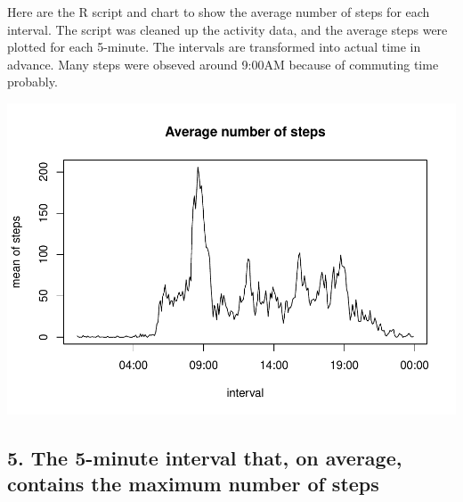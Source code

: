 \documentclass[]{article}
\newenvironment{Shaded}{\begin{snugshade}}{\end{snugshade}}
\newcommand{\KeywordTok}[1]{\textcolor[rgb]{0.13,0.29,0.53}{\textbf{#1}}}
\newcommand{\DataTypeTok}[1]{\textcolor[rgb]{0.13,0.29,0.53}{#1}}
\newcommand{\StringTok}[1]{\textcolor[rgb]{0.31,0.60,0.02}{#1}}
\newcommand{\OperatorTok}[1]{\textcolor[rgb]{0.81,0.36,0.00}{\textbf{#1}}}
\newcommand{\NormalTok}[1]{#1}
\begin{document}
Here are the R script and chart to show the average number of steps for
each interval. The script was cleaned up the activity data, and the
average steps were plotted for each 5-minute. The intervals are
transformed into actual time in advance. Many steps were obseved around
9:00AM because of commuting time probably.

\begin{Shaded}
\end{Shaded}

\includegraphics{PA1_template_files/figure-latex/unnamed-chunk-3-1.pdf}

\subsection{5. The 5-minute interval that, on average, contains the
maximum number of
steps}\label{the-5-minute-interval-that-on-average-contains-the-maximum-number-of-steps}
\end{document}
